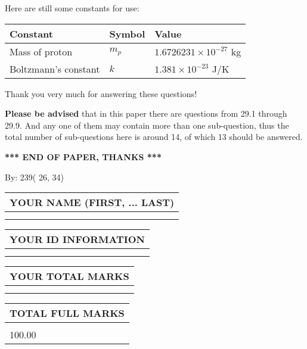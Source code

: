 \documentclass[12pt]{article}
\begin{document}
 

 
\vspace{0.3in}
   
   
 \vspace{0.2in}
Here are still some constants for use:
 
 
\noindent\begin{tabular}{|l|l|l|}
\hline
Constant & Symbol & Value \\
\hline
 
Mass of proton &
$m_p$ &
 $ 1.6726231 \times 10^{-27} $
kg \\
\hline
 
Boltzmann's constant &
$k$ &
 $ 1.381 \times 10^{-23} $
J/K \\
\hline
 
\end{tabular}
 
Thank you very much for answering these questions!
 
{\textbf{\large{Please be advised}}} that in this paper there are questions from
29.1 through
29.9.
And any one of them may contain more than one sub-question, thus the total number
of sub-questions here is around 14, of which
13 should be answered.
 
   
   
   
   
\vspace{1.0in} 
{\textbf{\large{ *** END OF PAPER, THANKS *** }}} 
   
   
\hspace{1.0in} By: 
         239(         26,          34)
   
   
   
   
\newpage 
\setcounter{page}{ 
    30001 } 
   
   
   
   
\noindent\begin{tabular}{|l|}
\hline
YOUR NAME (FIRST, ... LAST)  \\
\hline
 \\ 
 \\ 
\hline
\end{tabular}
\hspace{0.05in} \begin{tabular}{|l|}
\hline
 YOUR   ID   INFORMATION  \\
\hline
 \\ 
 \\ 
\hline
\end{tabular}
   
   
\vspace{0.2in}\noindent\begin{tabular}{|l|}
\hline
YOUR TOTAL MARKS  \\
\hline
 \\ 
 \\ 
\hline
\end{tabular}
\hspace{0.05in} \begin{tabular}{|l|}
\hline
TOTAL FULL MARKS  \\
\hline
 \\ 
100.00 \\
\hline
\end{tabular}
   
\end{document}
